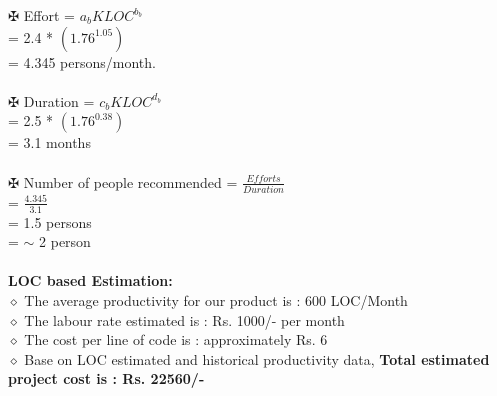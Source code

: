 $\maltese$  Effort = $a_{b}KLOC^{b_{b}}$ \\
\hspace*{0.10in} = 2.4 * $(1.76^{1.05})$ \\
\hspace*{0.10in} = 4.345 persons/month. \\
\\
$\maltese$  Duration  = $c_{b}KLOC^{d_{b}} $ \\
\hspace*{0.10in} = 2.5 * $(1.76^{0.38})$ \\
\hspace*{0.10in} = 3.1 months \\
\\
$\maltese$  Number  of  people recommended  = $\frac{Efforts}{Duration}$ \\
\hspace*{0.10in} = $\frac{4.345}{3.1}$ \\
\hspace*{0.10in} = 1.5 persons \\
\hspace*{0.10in} = $\sim$ 2 person \\
\\
\textbf{LOC based Estimation:} \\
\hspace*{0.5in} $ \diamond $ The average productivity for our product is : 600 LOC/Month \\
\hspace*{0.5in} $ \diamond $ The labour rate estimated is : Rs. 1000/- per month \\
\hspace*{0.5in} $ \diamond $ The cost per line of code is : approximately Rs. 6 \\
\hspace*{0.5in} $ \diamond $ Base on LOC estimated and historical productivity data, \textbf{Total estimated project cost is : Rs. 22560/-}
\newpage
